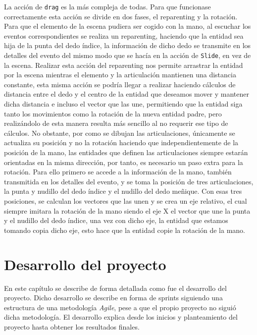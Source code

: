 \documentclass[a4paper, 12pt]{book}
\begin{document}
La acción de \texttt{drag} es la más compleja de todas. Para que funcionase correctamente esta acción se divide en dos fases, el reparenting y la rotación. Para que el elemento de la escena pudiera ser cogido con la mano, al escuchar los eventos correspondientes se realiza un reparenting, haciendo que la entidad sea hija de la punta del dedo índice, la información de dicho dedo se transmite en los detalles del evento del mismo modo que se hacía en la acción de \texttt{Slide}, en vez de la escena. Realizar esta acción del reparenting nos permite arrastrar la entidad por la escena mientras el elemento y la articulación mantienen una distancia constante, esta misma acción se podría llegar a realizar haciendo cálculos de distancia entre el dedo y el centro de la entidad que deseamos mover y mantener dicha distancia e incluso el vector que las une, permitiendo que la entidad siga tanto los movimientos como la rotación de la nueva entidad padre, pero realizándolo de esta manera resulta más sencillo al no requerir ese tipo de cálculos. No obstante, por como se dibujan las articulaciones, únicamente se actualiza su posición y no la rotación haciendo que independientemente de la posición de la mano, las entidades que definen las articulaciones siempre estarán orientadas en la misma dirección, por tanto, es necesario un paso extra para la rotación.
Para ello primero se accede a la información de la mano, también transmitida en los detalles del evento, y se toma la posición de tres articulaciones, la punta y nudillo del dedo índice y el nudillo del dedo meñique. Con esas tres posiciones, se calculan los vectores que las unen y se crea un eje relativo, el cual siempre imitara la rotación de la mano siendo el eje X el vector que une la punta y el nudillo del dedo índice, una vez con dicho eje, la entidad que estamos tomando copia dicho eje, esto hace que la entidad copie la rotación de la mano.


\cleardoublepage
\chapter{Desarrollo del proyecto}
\label{chap:Desarrollo del proyecto}
En este capítulo se describe de forma detallada como fue el desarrollo del proyecto. Dicho desarrollo
se describe en forma de sprints siguiendo una estructura de una metodología \textit{Agile}\cite{asana_agile_methodology}, pese a que el propio proyecto no siguió dicha metodología. 
El desarrollo explica desde los inicios y planteamiento del proyecto hasta obtener los resultados finales.
\end{document}
